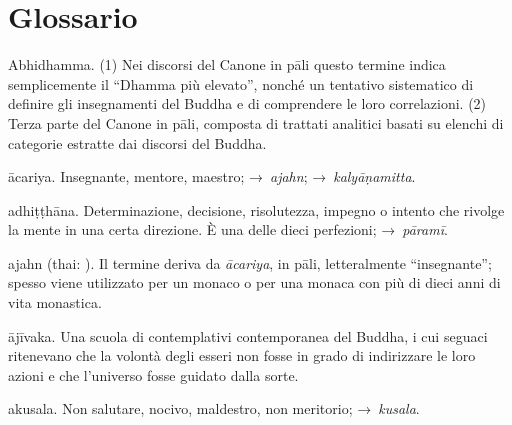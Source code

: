 
\chapter{Glossario}

\begin{glossarydescription}


\item[Abhidhamma.] (1) Nei discorsi del Canone in pāli questo termine
  indica semplicemente il ``Dhamma più elevato'', nonché un tentativo
  sistematico di definire gli insegnamenti del Buddha e di comprendere le loro
  correlazioni. (2) Terza parte del Canone in pāli, composta di trattati
  analitici basati su elenchi di categorie estratte dai discorsi del Buddha.

\item[ācariya.] Insegnante, mentore, maestro; →~\emph{ajahn};
  →~\emph{kalyāṇamitta}.

\item[adhiṭṭhāna.] Determinazione, decisione, risolutezza, impegno o
  intento che rivolge la mente in una certa direzione. È una delle dieci
  perfezioni; →~\emph{pāramī}.

\item[ajahn] (thai: ). Il termine deriva da \emph{ācariya}, in pāli,
  letteralmente ``insegnante''; spesso viene utilizzato per un monaco o per una
  monaca con più di dieci anni di vita monastica.

\item[ājīvaka.] Una scuola di contemplativi contemporanea del Buddha, i
  cui seguaci ritenevano che la volontà degli esseri non fosse in grado di
  indirizzare le loro azioni e che l'universo fosse guidato dalla sorte.

\item[akusala.] Non salutare, nocivo, maldestro, non meritorio;
  →~\emph{kusala}.


\end{glossarydescription}
